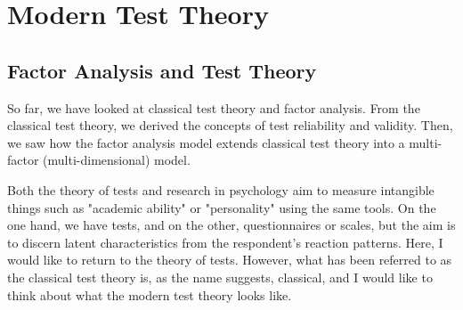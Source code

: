 \documentclass{ltjsbook}
\begin{document}
\chapter{Modern Test Theory}
\label{x04_IRT}
\section{Factor Analysis and Test Theory}
So far, we have looked at classical test theory and factor analysis. From the classical test theory, we derived the concepts of test reliability and validity. Then, we saw how the factor analysis model extends classical test theory into a multi-factor (multi-dimensional) model.

Both the theory of tests and research in psychology aim to measure intangible things such as "academic ability" or "personality" using the same tools. On the one hand, we have tests, and on the other, questionnaires or scales, but the aim is to discern latent characteristics from the respondent's reaction patterns. Here, I would like to return to the theory of tests. However, what has been referred to as the classical test theory is, as the name suggests, classical, and I would like to think about what the modern test theory looks like.
\end{document}
